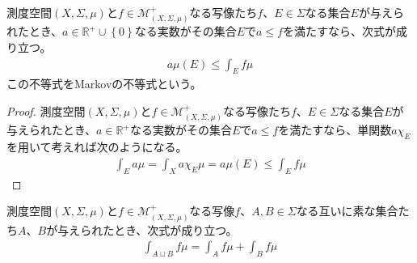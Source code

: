 \documentclass[dvipdfmx]{jsarticle}
\begin{document}
\begin{thm}[Markovの不等式]\label{4.6.1.12}
測度空間$(X,\varSigma,\mu)$と$f \in \mathcal{M}_{(X,\varSigma,\mu)}^{+}$なる写像たち$f$、$E \in \varSigma$なる集合$E$が与えられたとき、$a \in \mathbb{R}^{+} \cup \left\{ 0 \right\}$なる実数がその集合$E$で$a \leq f$を満たすなら、次式が成り立つ。
\begin{align*}
a\mu(E) \leq \int_{E} {f\mu}
\end{align*}
この不等式をMarkovの不等式という。
\end{thm}
\begin{proof}
測度空間$(X,\varSigma,\mu)$と$f \in \mathcal{M}_{(X,\varSigma,\mu)}^{+}$なる写像たち$f$、$E \in \varSigma$なる集合$E$が与えられたとき、$a \in \mathbb{R}^{+}$なる実数がその集合$E$で$a \leq f$を満たすなら、単関数$a\chi_{E}$を用いて考えれば次のようになる。
\begin{align*}
\int_{E} {a\mu} = \int_{X} {a\chi_{E}\mu} = a\mu(E) \leq \int_{E} {f\mu}
\end{align*}
\end{proof}
\begin{thm}\label{4.6.1.13}
測度空間$(X,\varSigma,\mu)$と$f \in \mathcal{M}_{(X,\varSigma,\mu)}^{+}$なる写像$f$、$A,B \in \varSigma$なる互いに素な集合たち$A$、$B$が与えられたとき、次式が成り立つ。
\begin{align*}
\int_{A \sqcup B} {f\mu} = \int_{A} {f\mu} + \int_{B} {f\mu}
\end{align*}
\end{thm}
\end{document}
